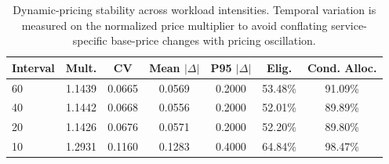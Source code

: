 \begin{table}[t]
\centering
\caption{Dynamic-pricing stability across workload intensities. Temporal variation is measured on the normalized price multiplier to avoid conflating service-specific base-price changes with pricing oscillation.}
\label{tab:c26_pricing_stability}
\begin{tabular}{lcccccc}
\hline
Interval & Mult. & CV & Mean $|\Delta|$ & P95 $|\Delta|$ & Elig. & Cond. Alloc. \\
\hline
60 & 1.1439 & 0.0665 & 0.0569 & 0.2000 & 53.48\% & 91.09\% \\
40 & 1.1442 & 0.0668 & 0.0556 & 0.2000 & 52.01\% & 89.89\% \\
20 & 1.1426 & 0.0676 & 0.0571 & 0.2000 & 52.20\% & 89.80\% \\
10 & 1.2931 & 0.1160 & 0.1283 & 0.4000 & 64.84\% & 98.47\% \\
\hline
\end{tabular}
\end{table}